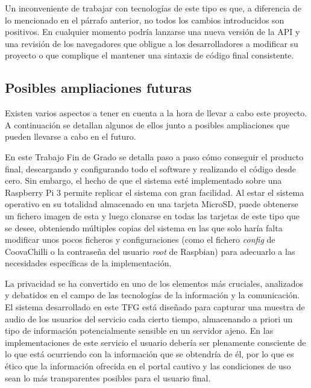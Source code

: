Un inconveniente de trabajar con tecnologías de este tipo es que, a diferencia de lo mencionado en el párrafo anterior, no todos los cambios introducidos son positivos. En cualquier momento podría lanzarse una nueva versión de la API y una revisión de los navegadores que obligue a los desarrolladores a modificar su proyecto o que complique el mantener una sintaxis de código final consistente.

\subsection{Posibles ampliaciones futuras}

Existen varios aspectos a tener en cuenta a la hora de llevar a cabo este proyecto. A continuación se detallan algunos de ellos junto a posibles ampliaciones que pueden llevarse a cabo en el futuro.


En este Trabajo Fin de Grado se detalla paso a paso cómo conseguir el producto final, descargando y configurando todo el software y realizando el código desde cero. Sin embargo, el hecho de que el sistema esté implementado sobre una Raspberry Pi 3 permite replicar el sistema con gran facilidad. Al estar el sistema operativo en su totalidad almacenado en una tarjeta MicroSD, puede obtenerse un fichero imagen de esta y luego clonarse en todas las tarjetas de este tipo que se desee, obteniendo múltiples copias del sistema en las que solo haría falta modificar unos pocos ficheros y configuraciones (como el fichero \emph{config} de CoovaChilli o la contraseña del usuario \emph{root} de Raspbian) para adecuarlo a las necesidades específicas de la implementación.


La privacidad se ha convertido en uno de los elementos más cruciales, analizados y debatidos en el campo de las tecnologías de la información y la comunicación. El sistema desarrollado en este TFG está diseñado para capturar una muestra de audio de los usuarios del servicio cada cierto tiempo, almacenando a priori un tipo de información potencialmente sensible en un servidor ajeno. En las implementaciones de este servicio el usuario debería ser plenamente consciente de lo que está ocurriendo con la información que se obtendría de él, por lo que es ético que la información ofrecida en el portal cautivo y las condiciones de uso sean lo más transparentes posibles para el usuario final.

